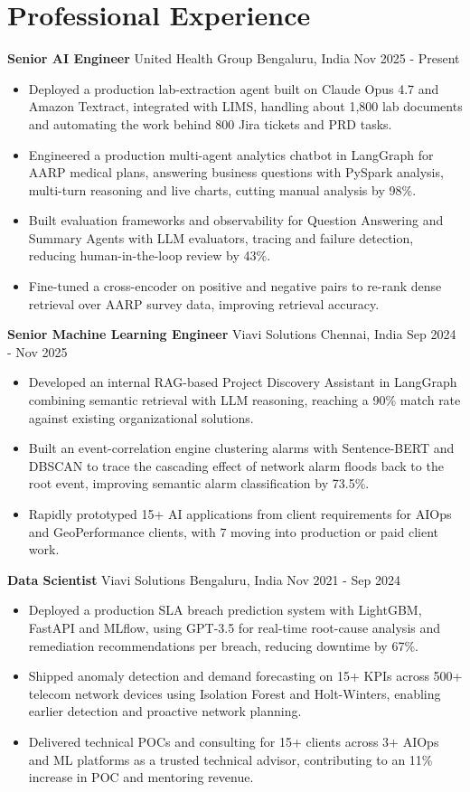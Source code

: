 \documentclass[10pt,a4paper]{article}
\newcommand{\role}[4]{\textbf{#1} \textbar{} #2 \hfill #3 \textbar{} #4\par}
\begin{document}
\section{Professional Experience}
\role{Senior AI Engineer}{United Health Group}{Bengaluru, India}{Nov 2025 - Present}
\begin{itemize}
  \item Deployed a production lab-extraction agent built on Claude Opus 4.7 and Amazon Textract, integrated with LIMS, handling about 1,800 lab documents and automating the work behind 800 Jira tickets and PRD tasks.
  \item Engineered a production multi-agent analytics chatbot in LangGraph for AARP medical plans, answering business questions with PySpark analysis, multi-turn reasoning and live charts, cutting manual analysis by 98\%.
  \item Built evaluation frameworks and observability for Question Answering and Summary Agents with LLM evaluators, tracing and failure detection, reducing human-in-the-loop review by 43\%.
  \item Fine-tuned a cross-encoder on positive and negative pairs to re-rank dense retrieval over AARP survey data, improving retrieval accuracy.
\end{itemize}
\vspace{3pt}
\role{Senior Machine Learning Engineer}{Viavi Solutions}{Chennai, India}{Sep 2024 - Nov 2025}
\begin{itemize}
  \item Developed an internal RAG-based Project Discovery Assistant in LangGraph combining semantic retrieval with LLM reasoning, reaching a 90\% match rate against existing organizational solutions.
  \item Built an event-correlation engine clustering alarms with Sentence-BERT and DBSCAN to trace the cascading effect of network alarm floods back to the root event, improving semantic alarm classification by 73.5\%.
  \item Rapidly prototyped 15+ AI applications from client requirements for AIOps and GeoPerformance clients, with 7 moving into production or paid client work.
\end{itemize}
\vspace{3pt}
\role{Data Scientist}{Viavi Solutions}{Bengaluru, India}{Nov 2021 - Sep 2024}
\begin{itemize}
  \item Deployed a production SLA breach prediction system with LightGBM, FastAPI and MLflow, using GPT-3.5 for real-time root-cause analysis and remediation recommendations per breach, reducing downtime by 67\%.
  \item Shipped anomaly detection and demand forecasting on 15+ KPIs across 500+ telecom network devices using Isolation Forest and Holt-Winters, enabling earlier detection and proactive network planning.
  \item Delivered technical POCs and consulting for 15+ clients across 3+ AIOps and ML platforms as a trusted technical advisor, contributing to an 11\% increase in POC and mentoring revenue.
\end{itemize}
\end{document}
